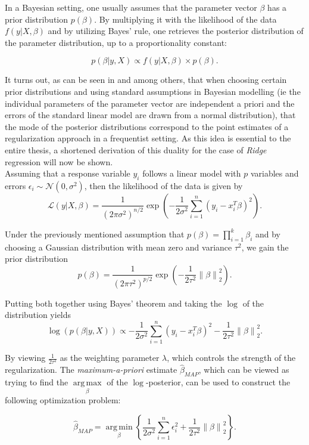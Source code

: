\documentclass[12pt,a4paper]{article}
\newcommand{\norm}[1]{\left\lVert#1\right\rVert}
\DeclareMathOperator*{\argmax}{arg\,max}
\DeclareMathOperator*{\argmin}{arg\,min}
\begin{document}
In a Bayesian setting, one usually assumes that the parameter vector $\mathbb{\beta}$ has a prior distribution $p(\mathbb{\beta})$. By multiplying it with the likelihood of the data $f(y|X,\beta)$ and by utilizing Bayes' rule, one retrieves the posterior distribution of the parameter distribution, up to a proportionality constant:

$$p(\beta|y,X) \propto f(y|X, \beta) \times p(\beta).$$  

It turns out, as can be seen in \textcite[248--250]{ESL2009} and \textcite{VanWieringen2015} among others, that when choosing certain prior distributions and using standard assumptions in Bayesian modelling (ie the individual parameters of the parameter vector are independent a priori and the errors of the standard linear model are drawn from a normal distribution), that the mode of the posterior distributions correspond to the point estimates of a regularization approach in a frequentist setting. As this idea is essential to the entire thesis, a shortened derivation of this duality for the case of \textit{Ridge} regression will now be shown.\\

Assuming that a response variable $y_i$ follows a linear model with $p$ variables and errors $\epsilon_i \sim \mathcal{N}(0, \sigma^2)$, then the likelihood of the data is given by
$$\mathcal{L}(y|X,\beta)=\frac{1}{(2\pi\sigma^2)^{n/2}}\exp\left(-\frac{1}{2\sigma^2}\sum_{i=1}^n(y_i-x_i^T\beta)^2\right).$$

Under the previously mentioned assumption that $p(\beta) = \prod_{i=1}^k \beta_i$ and by choosing a Gaussian distribution with mean zero and variance $\tau^2$, we gain the prior distribution
$$p(\beta) = \frac{1}{(2\pi\tau^2)^{p/2}}\exp\left(-\frac{1}{2\tau^2}\norm{\beta}_2^2\right).$$

Putting both together using Bayes' theorem and taking the $\log$ of the distribution yields
$$\log(p(\beta|y,X)) \propto -\frac{1}{2\sigma^2}\sum_{i=1}^n (y_i-x_i^T\beta)^2  - \frac{1}{2\tau^2}\norm{\beta}_2^2.$$

By viewing $\frac{1}{2\tau^2}$ as the weighting parameter $\lambda$, which controls the strength of the regularization. The \textit{maximum-a-priori} estimate $\hat{\beta}_{MAP}$, which can be viewed as trying to find the $\underset{\beta}{\argmax}$ of the $\log$-posterior, can be used to construct the following optimization problem:

$$\hat{\beta}_{MAP} = \underset{\beta}{\argmin}\left\{\frac{1}{2\sigma^2}\sum_{i=1}^n \epsilon_i^2  + \frac{1}{2\tau^2}\norm{\beta}_2^2\right\}.$$
\end{document}
